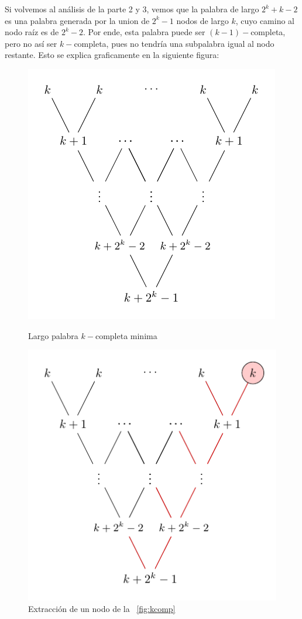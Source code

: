 \documentclass[letterpaper,10pt,table, dvipsnames]{article}
\newcommand{\figref}[1]{\figurename~\ref{#1}}
\begin{document}
Si volvemos al análisis de la parte 2 y 3, vemos que la palabra de largo $2^k + k - 2$ es una palabra generada por la union de $2^k - 1$ nodos de largo $k$, cuyo camino al nodo raíz es de $2^k - 2$. Por ende, esta palabra puede ser $(k-1)-$completa, pero no así ser $k-$completa, pues no tendría una subpalabra igual al nodo restante. Esto se explica graficamente en la siguiente figura:

\begin{figure}[!htb]
  \begin{minipage}{0.48\textwidth}
     \centering
     \includegraphics[scale=.8]{examples/tree_ex2.pdf}
     \caption{Largo palabra $k-$completa minima}\label{fig:kcomp}
   \end{minipage}\hfill
   \begin{minipage}{0.48\textwidth}
     \centering
   \includegraphics[scale=.8]{examples/tree_ex1.pdf}
   \caption{Extracción de un nodo de la \figref{fig:kcomp}}\label{fig:extr}
   \end{minipage}
 \end{figure}
\end{document}
